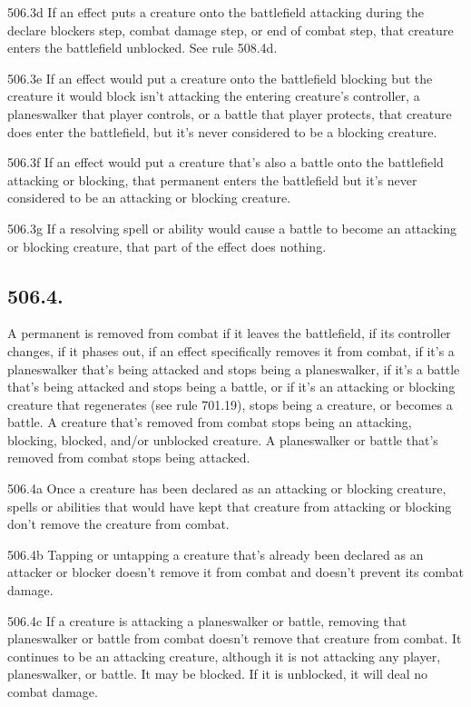 506.3d If an effect puts a creature onto the battlefield attacking during the declare blockers step, combat damage step, or end of combat step, that creature enters the battlefield unblocked. See rule 508.4d.

506.3e If an effect would put a creature onto the battlefield blocking but the creature it would block isn’t attacking the entering creature’s controller, a planeswalker that player controls, or a battle that player protects, that creature does enter the battlefield, but it’s never considered to be a blocking creature.

506.3f If an effect would put a creature that’s also a battle onto the battlefield attacking or blocking, that permanent enters the battlefield but it’s never considered to be an attacking or blocking creature.

506.3g If a resolving spell or ability would cause a battle to become an attacking or blocking creature, that part of the effect does nothing.

\subsection*{506.4.}
A permanent is removed from combat if it leaves the battlefield, if its controller changes, if it phases out, if an effect specifically removes it from combat, if it’s a planeswalker that’s being attacked and stops being a planeswalker, if it’s a battle that’s being attacked and stops being a battle, or if it’s an attacking or blocking creature that regenerates (see rule 701.19), stops being a creature, or becomes a battle. A creature that’s removed from combat stops being an attacking, blocking, blocked, and/or unblocked creature. A planeswalker or battle that’s removed from combat stops being attacked.

506.4a Once a creature has been declared as an attacking or blocking creature, spells or abilities that would have kept that creature from attacking or blocking don’t remove the creature from combat.

506.4b Tapping or untapping a creature that’s already been declared as an attacker or blocker doesn’t remove it from combat and doesn’t prevent its combat damage.

506.4c If a creature is attacking a planeswalker or battle, removing that planeswalker or battle from combat doesn’t remove that creature from combat. It continues to be an attacking creature, although it is not attacking any player, planeswalker, or battle. It may be blocked. If it is unblocked, it will deal no combat damage.

